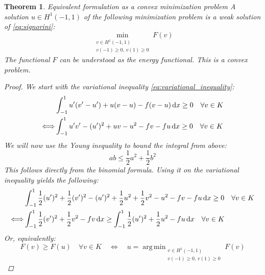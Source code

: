 \documentclass[headsepline,footsepline,footinclude=false,oneside,fontsize=11pt,paper=a4,listof=totoc,bibliography=totoc]{scrbook} %
\DeclareMathOperator*{\argmin}{arg\,min}
\newtheorem{theorem}{Theorem}
\begin{document}
\begin{theorem} Equivalent formulation as a convex minimization problem\newline
	A solution $u \in H^1(-1,1)$ of the following minimization problem is a weak solution of \eqref{eq:signorini}:
	\begin{equation} \label{eq:minimization_problem}
	\min_{\substack{v \in H^1(-1,1) \\ v(-1) \geq 0,\, v(1) \geq 0}} F(v)
	\end{equation}
	The functional $F$ can be understood as the energy functional. This is a convex problem.
	\begin{proof}
	We start with the variational inequality \eqref{eq:variational_inequality}:
	\begin{align*}
		&\int_{-1}^1 u'(v'-u') + u(v-u) - f(v-u) \dif x \geq 0 \quad \forall v \in K \\
		\Longleftrightarrow & \int_{-1}^1 u'v' - (u')^2 + uv - u^2 - fv - fu \dif x \geq 0 \quad \forall v \in K \\
	\end{align*}
	We will now use the Young inequality to bound the integral from above:
	\begin{equation}
	ab \leq \frac{1}{2} a^2 + \frac{1}{2} b^2 \label{eq:binomial_inequality}
	\end{equation}
	This follows directly from the binomial formula. Using it on the variational inequality yields the following:
	\begin{align*}
	&\int_{-1}^1 \frac{1}{2} (u')^2 + \frac{1}{2} (v')^2 - (u')^2 + \frac{1}{2} u^2 + \frac{1}{2} v^2 - u^2 - fv - fu \dif x \geq 0 \quad \forall v \in K \\
	\Longleftrightarrow & \int_{-1}^1 \frac{1}{2} (v')^2 + \frac{1}{2} v^2 - fv \dif x \geq \int_{-1}^1 \frac{1}{2} (u')^2 + \frac{1}{2} u^2 - fu \dif x \quad \forall v \in K
	\end{align*}
	Or, equivalently:
	\begin{equation*}
	F(v) \geq F(u) \quad \forall v \in K 
	\quad \Longleftrightarrow \quad u = \argmin_{\substack{v \in H^1(-1,1) \\ v(-1) \geq 0,\, v(1) \geq 0}} F(v)
	\end{equation*}
	

\end{proof}
\end{theorem}
\end{document}
